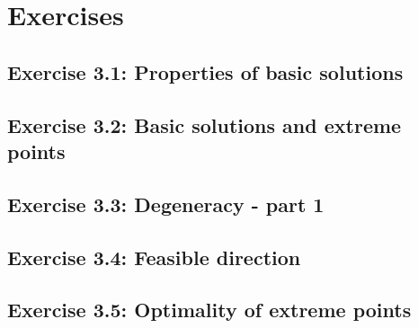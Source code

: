 \vfill
\pagebreak
\section{Exercises}

\subsection*{Exercise 3.1: Properties of basic solutions}


\subsection*{Exercise 3.2: Basic solutions and extreme points}


\subsection*{Exercise 3.3: Degeneracy - part 1}


\subsection*{Exercise 3.4: Feasible direction}


\subsection*{Exercise 3.5: Optimality of extreme points}






